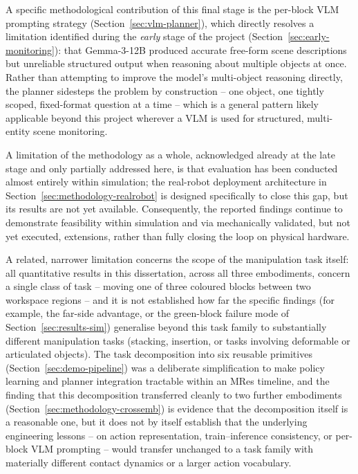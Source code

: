 \documentclass[12pt]{article}
\begin{document}
A specific methodological contribution of this final stage is the per-block VLM prompting strategy (Section~\ref{sec:vlm-planner}), which directly resolves a limitation identified during the \emph{early} stage of the project (Section~\ref{sec:early-monitoring}): that Gemma-3-12B produced accurate free-form scene descriptions but unreliable structured output when reasoning about multiple objects at once. Rather than attempting to improve the model's multi-object reasoning directly, the planner sidesteps the problem by construction -- one object, one tightly scoped, fixed-format question at a time -- which is a general pattern likely applicable beyond this project wherever a VLM is used for structured, multi-entity scene monitoring.

A limitation of the methodology as a whole, acknowledged already at the late stage and only partially addressed here, is that evaluation has been conducted almost entirely within simulation; the real-robot deployment architecture in Section~\ref{sec:methodology-realrobot} is designed specifically to close this gap, but its results are not yet available. Consequently, the reported findings continue to demonstrate feasibility within simulation and via mechanically validated, but not yet executed, extensions, rather than fully closing the loop on physical hardware.

A related, narrower limitation concerns the scope of the manipulation task itself: all quantitative results in this dissertation, across all three embodiments, concern a single class of task -- moving one of three coloured blocks between two workspace regions -- and it is not established how far the specific findings (for example, the far-side advantage, or the green-block failure mode of Section~\ref{sec:results-sim}) generalise beyond this task family to substantially different manipulation tasks (stacking, insertion, or tasks involving deformable or articulated objects). The task decomposition into six reusable primitives (Section~\ref{sec:demo-pipeline}) was a deliberate simplification to make policy learning and planner integration tractable within an MRes timeline, and the finding that this decomposition transferred cleanly to two further embodiments (Section~\ref{sec:methodology-crossemb}) is evidence that the decomposition itself is a reasonable one, but it does not by itself establish that the underlying engineering lessons -- on action representation, train--inference consistency, or per-block VLM prompting -- would transfer unchanged to a task family with materially different contact dynamics or a larger action vocabulary.
\end{document}
